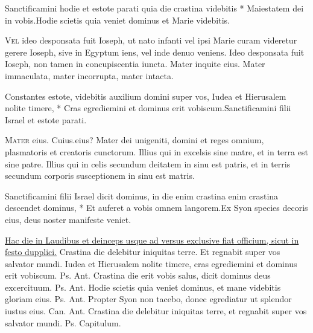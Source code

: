 \begin{multicols*}{2}
\begin{responsory}
{Sanctificamini hodie et estote parati quia die crastina videbitis * Maiestatem dei in vobis.}{Hodie scietis quia veniet dominus et Marie videbitis.}
\end{responsory}
\lettrine[lines=2]{\zallmancaps \color{Blue} V}{el} ideo desponsata fuit Ioseph, ut nato infanti vel ipsi Marie curam videretur gerere Ioseph, sive in Egyptum iens, vel inde denuo veniens. Ideo desponsata fuit Ioseph, non tamen in concupiscentia iuncta. Mater inquite eius. Mater immaculata, mater incorrupta, mater intacta.
\begin{responsory}
{Constantes estote, videbitis auxilium domini super vos, Iudea et Hierusalem nolite timere, * Cras egrediemini et dominus erit vobiscum.}{Sanctificamini filii Israel et estote parati.}
\end{responsory}
\lettrine[lines=2]{\zallmancaps \color{Red} M}{ater} eius. Cuius.eius? Mater dei unigeniti, domini et reges omnium, plasmatoris et creatoris cunctorum. Illius qui in excelsis sine matre, et in terra est sine patre. Illius qui in celis secundum deitatem in sinu est patris, et in terris secundum corporis susceptionem in sinu est matris.
\begin{responsory-doxology}
{Sanctificamini filii Israel dicit dominus, in die enim crastina enim crastina descendet dominus, * Et auferet a vobis omnem langorem.}{Ex Syon species decoris eius, deus noster manifeste veniet.}
\end{responsory-doxology}
\newline \ul{Hac die in Laudibus et deinceps usque ad versus exclusive fiat officium, sicut in festo dupplici.}
\newline \V Crastina die delebitur iniquitas terre.
\newline \R Et regnabit super vos salvator mundi.
 Iudea et Hierusalem nolite timere, cras egrediemini et dominus erit vobiscum. {\color{Red} Ps.}  {\color{Red} Ant.} Crastina die erit vobis salus, dicit dominus deus excercituum. {\color{Red} Ps.}  {\color{Red} Ant.} Hodie scietis quia veniet dominus, et mane videbitis gloriam eius. {\color{Red} Ps.}  {\color{Red} Ant.} Propter Syon non tacebo, donec egrediatur ut splendor iustus eius. {\color{Red} Can.}  {\color{Red} Ant.} Crastina die delebitur iniquitas terre, et regnabit super vos salvator mundi. {\color{Red} Ps.}  {\color{Red} Capitulum.}

\end{multicols*}
